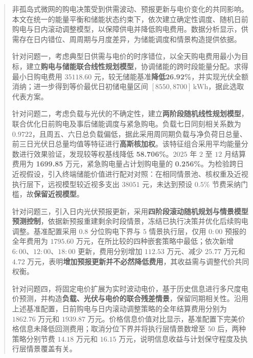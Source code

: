\begin{abstract}
非孤岛式微网的购电决策受到供需波动、预报更新与电价变化的共同影响。本文在统一的能量平衡和储能状态约束下，依次建立确定性调度、随机日前购电与日内滚动调整模型，以保障供电并降低购电费用。数据分析显示，供需存在日内错位、周周期与月度差异，为储能调度和情景构造提供依据。

针对问题一，考虑典型日供需与电价的时序错位，以全天购电费用最小为目标，建立\textbf{购电与储能联合线性规划模型}，协调储能的跨时段能量分配。求得最小日购电费用 $35118.60$ 元，较无储能基准\textbf{降低26.92\%}，并实现光伏全额消纳；进一步得到等价最优日初储电量区间 $[8550,8700]\,\mathrm{kWh}$，据此选取代表方案。

针对问题二，考虑负载与光伏的不确定性，建立\textbf{两阶段随机线性规划模型}，联合优化日前购电及事后储能调度与紧急购电。负载七日同刻相关系数为 $0.9722$，且周五、六日总负载偏低，据此采用周同期负载与净负荷日总量、前三日光伏日总量均值等特征进行\textbf{高斯核加权}。该特征组合采用平均能量分数进行效果验证，发现较等权基线降低 \textbf{58.706\%}。$2025$ 年 $2$ 至 $12$ 月结算费用为 \textbf{1699.85} 万元，紧急购电量占计划购电量的 \textbf{0.256\%}。为检验跨日近视假设，引入终端储能价值进行配对对照：在相同情景池、核权重及近视执行层下，远视模型较近视多支出 $38051$ 元，未达到预设 $0.5\%$ 节费采纳门槛，故\textbf{保留近视模型}。

针对问题三，引入日内光伏预报更新，采用\textbf{四阶段滚动随机规划与情景模型预测控制}，依据新预报重建剩余时段情景，冻结已执行决策并优化后续购电调整。基准配置采用 $0.8$ 分位购电下界与 $5$ 情景执行层，仅用 $0{:}00$ 预报的全年费用为 $1795.60$ 万元，在所比较的四种嵌套策略中最低；依次新增 $6{:}00$、$12{:}00$、$18{:}00$ 更新，费用分别增加 $112.53$ 万元、减少 $25.77$ 万元和 $4.72$ 万元，表明\textbf{增加预报更新并不必然降低费用}，其收益需与调整代价共同权衡。

针对问题四，将固定电价扩展为实时波动电价，基于历史信息进行多尺度电价预测，并构造\textbf{负载、光伏与电价的联合残差情景}，保留同期相关性。沿用上述基准配置，日前购电与日内滚动调整策略的全年结算费用分别为 $1862.76$ 万元和 $1939.87$ 万元。价格信息价值对比显示，基准配置下完美价格信息未降低回测费用；取消分位下界并将执行层情景数增至 $50$ 后，两种策略分别节费 $14.18$ 万元和 $16.15$ 万元，说明信息收益与计划保守程度及执行层情景覆盖有关。

\end{abstract}